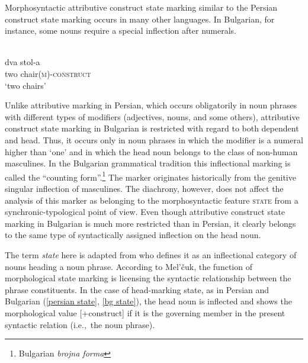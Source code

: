 Morphosyntactic attributive construct state marking similar to the Persian construct state marking occurs in many other languages. In Bulgarian, for instance, some nouns require a special inflection after numerals.
\begin{exe}
\ex 
{}\\
\label{bg state}
\gll 	dva 	stol-a\\
	two	chair{\textsc{(m)-construct}}\\
\glt 	‘two chairs’
\end{exe}
Unlike attributive  marking in Persian, which occurs obligatorily in noun phrases with different types of modifiers (adjectives, nouns, and some others), attributive construct state marking in Bulgarian is restricted with regard to both dependent and head. Thus, it occurs only in noun phrases in which the modifier is a numeral higher than ‘one’ and in which the head noun belongs to the class of non-human masculines. In the Bulgarian grammatical tradition this inflectional marking is called the “counting form”.\footnote{Bulgarian \emph{brojna forma}} The marker originates historically from the genitive singular inflection of masculines. The diachrony, however, does not affect the analysis of this marker as belonging to the morphosyntactic feature \textsc{state} from a synchronic-typological point of view. Even though attributive construct state marking in Bulgarian is much more restricted than in Persian, it clearly belongs to the same type of syntactically assigned inflection on the head noun.

The term \emph{state} here is adapted from \citet[114–116]{melcuk2006} who defines it as an inflectional category of nouns heading a noun phrase. According to Mel'čuk, the function of morphological state marking is licensing the syntactic relationship between the phrase constituents. In the case of head-marking state, as in Persian and Bulgarian (\ref{persian state}, \ref{bg state}), the head noun is inflected and shows the morphological value [+construct] if it is the governing member in the present syntactic relation (i.e.,~the noun phrase). 

